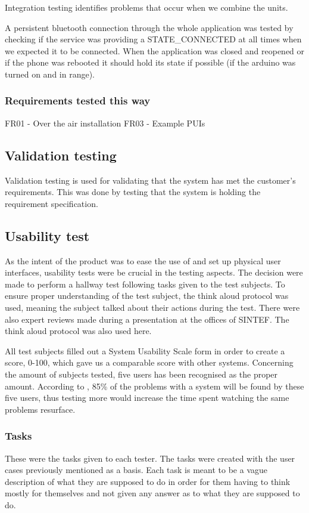 			Integration testing identifies problems that occur when we combine the units.

			A persistent bluetooth connection through the whole application was tested by checking if the service was providing a STATE\_CONNECTED at all times when we expected it to be connected. When the application was closed and reopened or if the phone was rebooted it should hold its state if possible (if the arduino was turned on and in range). 

			\subsubsection{Requirements tested this way}
			FR01 - Over the air installation
			FR03 - Example PUIs

		\subsection{Validation testing}
			Validation testing is used for validating that the system has met the customer's requirements. This was done by testing that the system is holding the requirement specification.


		\subsection{Usability test}
		As the intent of the product was to ease the use of and set up physical user interfaces, usability tests were be crucial in the testing aspects. The decision were made to perform a hallway test following tasks given to the test subjects. To ensure proper understanding of the test subject, the think aloud protocol was used, meaning the subject talked about their actions during the test. There were also expert reviews made during a presentation at the offices of SINTEF. The think aloud protocol was also used here.

		All test subjects filled out a System Usability Scale form in order to create a score, 0-100, which gave us a comparable score with other systems. Concerning the amount of subjects tested, five users has been recognised as the proper amount. According to \cite{Nielsen}, 85\% of the problems with a system will be found by these five users, thus testing more would increase the time spent watching the same problems resurface.

		\subsubsection{Tasks}
		These were the tasks given to each tester. The tasks were created with the user cases previously mentioned as a basis. Each task is meant to be a vague description of what they are supposed to do in order for them having to think mostly for themselves and not given any answer as to what they are supposed to do. 

